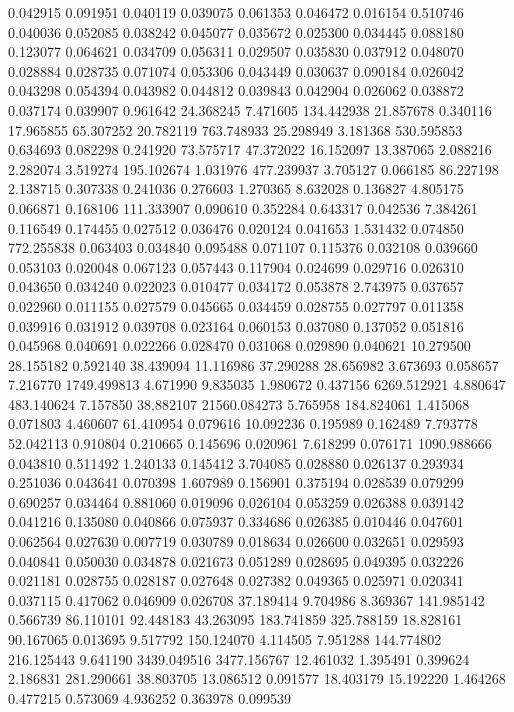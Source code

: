 0.042915
0.091951
0.040119
0.039075
0.061353
0.046472
0.016154
0.510746
0.040036
0.052085
0.038242
0.045077
0.035672
0.025300
0.034445
0.088180
0.123077
0.064621
0.034709
0.056311
0.029507
0.035830
0.037912
0.048070
0.028884
0.028735
0.071074
0.053306
0.043449
0.030637
0.090184
0.026042
0.043298
0.054394
0.043982
0.044812
0.039843
0.042904
0.026062
0.038872
0.037174
0.039907
0.961642
24.368245
7.471605
134.442938
21.857678
0.340116
17.965855
65.307252
20.782119
763.748933
25.298949
3.181368
530.595853
0.634693
0.082298
0.241920
73.575717
47.372022
16.152097
13.387065
2.088216
2.282074
3.519274
195.102674
1.031976
477.239937
3.705127
0.066185
86.227198
2.138715
0.307338
0.241036
0.276603
1.270365
8.632028
0.136827
4.805175
0.066871
0.168106
111.333907
0.090610
0.352284
0.643317
0.042536
7.384261
0.116549
0.174455
0.027512
0.036476
0.020124
0.041653
1.531432
0.074850
772.255838
0.063403
0.034840
0.095488
0.071107
0.115376
0.032108
0.039660
0.053103
0.020048
0.067123
0.057443
0.117904
0.024699
0.029716
0.026310
0.043650
0.034240
0.022023
0.010477
0.034172
0.053878
2.743975
0.037657
0.022960
0.011155
0.027579
0.045665
0.034459
0.028755
0.027797
0.011358
0.039916
0.031912
0.039708
0.023164
0.060153
0.037080
0.137052
0.051816
0.045968
0.040691
0.022266
0.028470
0.031068
0.029890
0.040621
10.279500
28.155182
0.592140
38.439094
11.116986
37.290288
28.656982
3.673693
0.058657
7.216770
1749.499813
4.671990
9.835035
1.980672
0.437156
6269.512921
4.880647
483.140624
7.157850
38.882107
21560.084273
5.765958
184.824061
1.415068
0.071803
4.460607
61.410954
0.079616
10.092236
0.195989
0.162489
7.793778
52.042113
0.910804
0.210665
0.145696
0.020961
7.618299
0.076171
1090.988666
0.043810
0.511492
1.240133
0.145412
3.704085
0.028880
0.026137
0.293934
0.251036
0.043641
0.070398
1.607989
0.156901
0.375194
0.028539
0.079299
0.690257
0.034464
0.881060
0.019096
0.026104
0.053259
0.026388
0.039142
0.041216
0.135080
0.040866
0.075937
0.334686
0.026385
0.010446
0.047601
0.062564
0.027630
0.007719
0.030789
0.018634
0.026600
0.032651
0.029593
0.040841
0.050030
0.034878
0.021673
0.051289
0.028695
0.049395
0.032226
0.021181
0.028755
0.028187
0.027648
0.027382
0.049365
0.025971
0.020341
0.037115
0.417062
0.046909
0.026708
37.189414
9.704986
8.369367
141.985142
0.566739
86.110101
92.448183
43.263095
183.741859
325.788159
18.828161
90.167065
0.013695
9.517792
150.124070
4.114505
7.951288
144.774802
216.125443
9.641190
3439.049516
3477.156767
12.461032
1.395491
0.399624
2.186831
281.290661
38.803705
13.086512
0.091577
18.403179
15.192220
1.464268
0.477215
0.573069
4.936252
0.363978
0.099539
